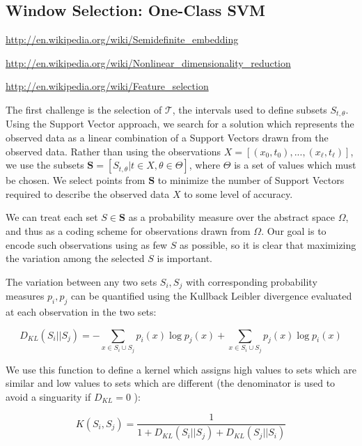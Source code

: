 \documentclass[10pt]{article}
\begin{document}
 
\subsection{Window Selection: One-Class SVM}
\url{http://en.wikipedia.org/wiki/Semidefinite_embedding}

\url{http://en.wikipedia.org/wiki/Nonlinear_dimensionality_reduction}

\url{http://en.wikipedia.org/wiki/Feature_selection}

The first challenge is the selection of \( \mathcal{T} \), the intervals used to define subsets \( S_{t,\theta} \).  Using the Support Vector approach, we search for a solution which represents the observed data as a linear combination of a Support Vectors drawn from the observed data.  Rather than using the observations \( X = [ (x_0,t_0),...,(x_\ell,t_\ell) ] \), we use the subsets \( \mathbf{S} = [ S_{t,\theta} | t \in X, \theta \in \Theta ] \), where \( \Theta \) is a set of values which must be chosen.  We select points from \( \mathbf{S} \) to minimize the number of Support Vectors required to describe the observed data \( X \) to some level of accuracy.

We can treat each set \( S \in \mathbf{S} \) as a probability measure over the abstract space \( \Omega \), and thus as a coding scheme for observations drawn from \( \Omega \).  Our goal is to encode such observations using as few \( S \) as possible, so it is clear that maximizing the variation among the selected \( S \) is important.  

The variation between any two sets \( S_i, S_j \) with corresponding probability measures \( p_i, p_j \) can be quantified using the Kullback Leibler divergence evaluated at each observation in the two sets:

\begin{equation}
D_{KL}(S_i||S_j) = -\sum_{x \in S_i \cup S_j} p_i(x) \log p_j(x) + \sum_{x \in S_i \cup S_j} p_j(x) \log p_i(x)
\end{equation}

We use this function to define a kernel which assigns high values to sets which are similar and low values to sets which are different (the denominator is used to avoid a singuarity if \( D_{KL} = 0 \) ):

\begin{equation}
K(S_i,S_j) = \frac{1}{1+ D_{KL}( S_i || S_j ) + D_{KL}( S_j || S_i )}
\end{equation}
\end{document}
